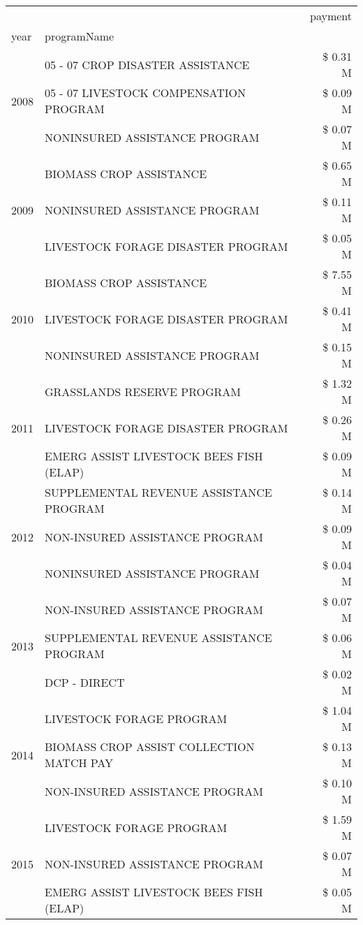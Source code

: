 \begin{tabular}{llr}
\toprule
 &  & payment \\
year & programName &  \\
\midrule
\multirow[t]{3}{*}{2008} & 05 - 07 CROP DISASTER ASSISTANCE & \$ 0.31 M \\
 & 05 - 07 LIVESTOCK COMPENSATION PROGRAM & \$ 0.09 M \\
 & NONINSURED ASSISTANCE PROGRAM & \$ 0.07 M \\
\cline{1-3}
\multirow[t]{3}{*}{2009} & BIOMASS CROP ASSISTANCE & \$ 0.65 M \\
 & NONINSURED ASSISTANCE PROGRAM & \$ 0.11 M \\
 & LIVESTOCK FORAGE DISASTER  PROGRAM & \$ 0.05 M \\
\cline{1-3}
\multirow[t]{3}{*}{2010} & BIOMASS CROP ASSISTANCE & \$ 7.55 M \\
 & LIVESTOCK FORAGE DISASTER  PROGRAM & \$ 0.41 M \\
 & NONINSURED ASSISTANCE PROGRAM & \$ 0.15 M \\
\cline{1-3}
\multirow[t]{3}{*}{2011} & GRASSLANDS RESERVE PROGRAM & \$ 1.32 M \\
 & LIVESTOCK FORAGE DISASTER PROGRAM & \$ 0.26 M \\
 & EMERG ASSIST LIVESTOCK BEES FISH (ELAP) & \$ 0.09 M \\
\cline{1-3}
\multirow[t]{3}{*}{2012} & SUPPLEMENTAL REVENUE ASSISTANCE PROGRAM & \$ 0.14 M \\
 & NON-INSURED ASSISTANCE PROGRAM & \$ 0.09 M \\
 & NONINSURED ASSISTANCE PROGRAM & \$ 0.04 M \\
\cline{1-3}
\multirow[t]{3}{*}{2013} & NON-INSURED ASSISTANCE PROGRAM & \$ 0.07 M \\
 & SUPPLEMENTAL REVENUE ASSISTANCE PROGRAM & \$ 0.06 M \\
 & DCP - DIRECT & \$ 0.02 M \\
\cline{1-3}
\multirow[t]{3}{*}{2014} & LIVESTOCK FORAGE PROGRAM & \$ 1.04 M \\
 & BIOMASS CROP ASSIST COLLECTION MATCH PAY & \$ 0.13 M \\
 & NON-INSURED ASSISTANCE PROGRAM & \$ 0.10 M \\
\cline{1-3}
\multirow[t]{3}{*}{2015} & LIVESTOCK FORAGE PROGRAM & \$ 1.59 M \\
 & NON-INSURED ASSISTANCE PROGRAM & \$ 0.07 M \\
 & EMERG ASSIST LIVESTOCK BEES FISH (ELAP) & \$ 0.05 M \\

\end{tabular}
